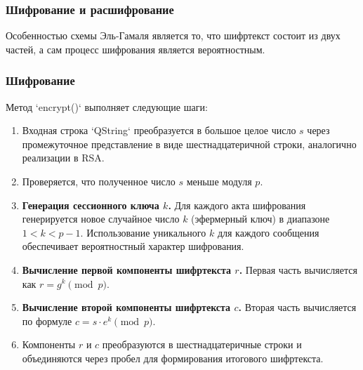 

\subsubsection{Шифрование и расшифрование}
Особенностью схемы Эль-Гамаля является то, что шифртекст состоит из двух частей, а сам процесс шифрования является вероятностным.

\subsubsection*{Шифрование}
Метод `encrypt()` выполняет следующие шаги:
\begin{enumerate}
    \item Входная строка `QString` преобразуется в большое целое число $s$ через промежуточное представление в виде шестнадцатеричной строки, аналогично реализации в RSA.
    \item Проверяется, что полученное число $s$ меньше модуля $p$.
    \item \textbf{Генерация сессионного ключа $k$.} Для каждого акта шифрования генерируется новое случайное число $k$ (эфермерный ключ) в диапазоне $1 < k < p-1$. Использование уникального $k$ для каждого сообщения обеспечивает вероятностный характер шифрования.
    \item \textbf{Вычисление первой компоненты шифртекста $r$.} Первая часть вычисляется как $r = g^k \pmod p$.
    \item \textbf{Вычисление второй компоненты шифртекста $c$.} Вторая часть вычисляется по формуле $c = s \cdot e^k \pmod p$.
    \item Компоненты $r$ и $c$ преобразуются в шестнадцатеричные строки и объединяются через пробел для формирования итогового шифртекста.
\end{enumerate}



